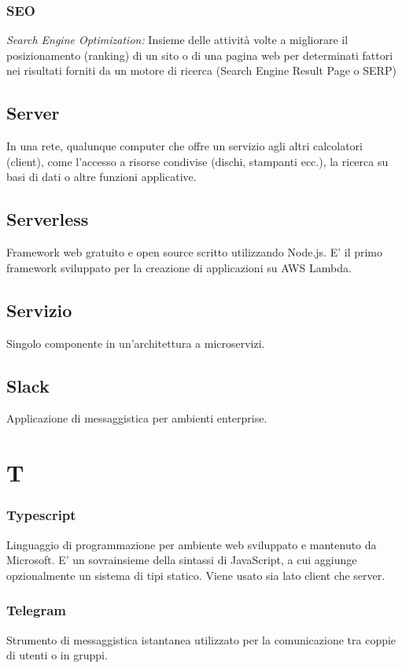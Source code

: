 \subsubsection*{SEO}
\textit{Search Engine Optimization:} Insieme delle attività volte a migliorare il posizionamento (ranking) di un sito o di una pagina web per determinati fattori nei risultati forniti
da un motore di ricerca (Search Engine Result Page o SERP)

\subsection*{Server}
In una rete, qualunque computer che offre un servizio agli altri calcolatori (client), come l'accesso a risorse condivise (dischi, stampanti ecc.), la ricerca su basi di dati o altre funzioni applicative.

\subsection*{Serverless}
Framework web gratuito e open source scritto utilizzando Node.js. E' il primo framework sviluppato per la creazione di applicazioni su AWS Lambda.

\subsection*{Servizio}
Singolo componente in un'architettura a microservizi.

\subsection*{Slack}
Applicazione di messaggistica per ambienti enterprise.

\section*{T}
\subsubsection*{Typescript}
Linguaggio di programmazione per ambiente web sviluppato e mantenuto da Microsoft. E' un sovrainsieme della sintassi di JavaScript,
a cui aggiunge opzionalmente un sistema di tipi statico. Viene usato sia lato client che server.
\subsubsection*{Telegram}
Strumento di messaggistica istantanea utilizzato per la comunicazione tra coppie di utenti o in gruppi.

